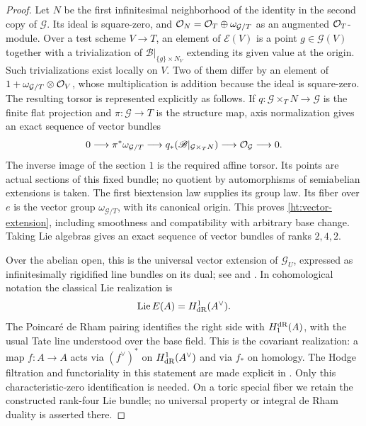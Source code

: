 \begin{proof}
Let $N$ be the first infinitesimal neighborhood of the identity in
the second copy of $\mathcal G$. Its ideal is square-zero, and
$\mathcal O_N=\mathcal O_T\oplus\omega_{\mathcal G/T}$ as an augmented
$\mathcal O_T$-module. Over a test scheme $V\to T$, an element of
$\mathcal E(V)$ is a point $g\in\mathcal G(V)$ together with a
trivialization of $\mathscr B|_{\{g\}\times N_V}$ extending its
given value at the origin. Such trivializations exist locally on $V$.
Two of them differ by an element of
$1+\omega_{\mathcal G/T}\otimes\mathcal O_V$, whose multiplication is
addition because the ideal is square-zero. The resulting torsor is
represented explicitly as follows. If
$q:\mathcal G\times_TN\to\mathcal G$ is the finite flat projection
and $\pi:\mathcal G\to T$ is the structure map, axis normalization
gives an exact sequence of vector bundles
\[
 0\longrightarrow\pi^*\omega_{\mathcal G/T}
 \longrightarrow q_*(\mathscr B|_{\mathcal G\times_TN})
 \longrightarrow\mathcal O_{\mathcal G}\longrightarrow0.
\]
The inverse image of the section $1$ is the required affine torsor.
Its points are actual sections of this fixed bundle; no quotient by
automorphisms of semiabelian extensions is taken. The first
biextension law supplies its group law. Its fiber over $e$ is the
vector group $\omega_{\mathcal G/T}$, with its canonical origin.
This proves \eqref{ht:vector-extension}, including smoothness and
compatibility with arbitrary base change. Taking Lie algebras gives
an exact sequence of vector bundles of ranks $2,4,2$.

Over the abelian open, this is the universal vector extension of
$\mathcal G_U$, expressed as infinitesimally rigidified line bundles
on its dual; see \cite[I, \S2.6 and \S4]{MazurMessing1974} and
\cite[Proposition~2.2]{Cais2010}. In cohomological notation the
classical Lie realization is
\[
 \operatorname{Lie} E(A)=H^1_{\rm dR}(A^\vee).
\]
The Poincar\'e de Rham pairing identifies the right side with
$H_1^{\rm dR}(A)$, with the usual Tate line understood over the base
field. This is the covariant realization: a map $f:A\to A$ acts via
$(f^\vee)^*$ on $H^1_{\rm dR}(A^\vee)$ and via $f_*$ on homology.
The Hodge filtration and functoriality in this statement are made
explicit in \cite[Proposition~5.1 and Corollary~5.2]{Cais2010}.
Only this characteristic-zero identification is needed. On a toric
special fiber we retain the constructed rank-four Lie bundle; no
universal property or integral de Rham duality is asserted there.


\end{proof}
